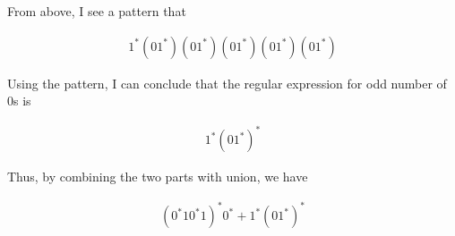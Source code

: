 \documentclass[12pt]{article}
\begin{document}
\begin{enumerate}[a.]
    \bigskip

    From above, I see a pattern that

    \begin{align}
        1^*(01^*)(01^*)(01^*)(01^*)(01^*)
    \end{align}

    \bigskip

    Using the pattern, I can conclude that the regular expression for
    odd number of 0s is

    \begin{align}
        1^*(01^*)^*
    \end{align}

    \bigskip

    Thus, by combining the two parts with union, we have

    \begin{align}
    (0^*10^*1)^*0^* + 1^*(01^*)^*
    \end{align}














\end{enumerate}
\end{document}
